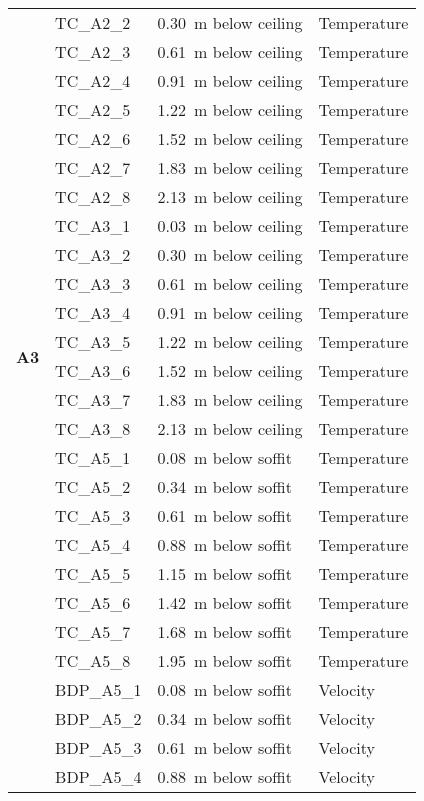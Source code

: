 \begin{longtable}[c]{c|lll}
 & TC\_A2\_2  & 0.30~m below ceiling & Temperature \\
 & TC\_A2\_3  & 0.61~m below ceiling & Temperature \\
 & TC\_A2\_4  & 0.91~m below ceiling & Temperature \\
 & TC\_A2\_5  & 1.22~m below ceiling & Temperature \\
 & TC\_A2\_6  & 1.52~m below ceiling & Temperature \\
 & TC\_A2\_7  & 1.83~m below ceiling & Temperature \\
 & TC\_A2\_8  & 2.13~m below ceiling & Temperature \\
\midrule
 \multirow{10}{*}{\large{\textbf{A3}}}
 & TC\_A3\_1  & 0.03~m below ceiling & Temperature \\
 & TC\_A3\_2  & 0.30~m below ceiling & Temperature \\
 & TC\_A3\_3  & 0.61~m below ceiling & Temperature \\
 & TC\_A3\_4  & 0.91~m below ceiling & Temperature \\
 & TC\_A3\_5  & 1.22~m below ceiling & Temperature \\
 & TC\_A3\_6  & 1.52~m below ceiling & Temperature \\
 & TC\_A3\_7  & 1.83~m below ceiling & Temperature \\
 & TC\_A3\_8  & 2.13~m below ceiling & Temperature \\
\bottomrule
\newpage
\multirow{16}{*}{\large{\textbf{A5}}}
 & TC\_A5\_1  & 0.08~m below soffit  & Temperature \\
 & TC\_A5\_2  & 0.34~m below soffit  & Temperature \\
 & TC\_A5\_3  & 0.61~m below soffit  & Temperature \\
 & TC\_A5\_4  & 0.88~m below soffit  & Temperature \\
 & TC\_A5\_5  & 1.15~m below soffit  & Temperature \\
 & TC\_A5\_6  & 1.42~m below soffit  & Temperature \\
 & TC\_A5\_7  & 1.68~m below soffit  & Temperature \\
 & TC\_A5\_8  & 1.95~m below soffit  & Temperature \\
\cline{2-4}
 & BDP\_A5\_1 & 0.08~m below soffit  & Velocity \\
 & BDP\_A5\_2 & 0.34~m below soffit  & Velocity \\
 & BDP\_A5\_3 & 0.61~m below soffit  & Velocity \\
 & BDP\_A5\_4 & 0.88~m below soffit  & Velocity \\

\end{longtable}
